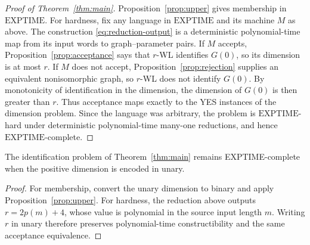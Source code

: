 \begin{proof}[Proof of Theorem~\ref{thm:main}]
Proposition~\ref{prop:upper} gives membership in \(\mathrm{EXPTIME}\).
For hardness, fix any language in \(\mathrm{EXPTIME}\) and its machine
\(M\) as above.  The construction \eqref{eq:reduction-output} is a
deterministic polynomial-time map from its input words to graph--parameter
pairs.  If \(M\) accepts, Proposition~\ref{prop:acceptance} says that
\(r\)-WL identifies \(G(0)\), so its dimension is at most \(r\).
If \(M\) does not accept, Proposition~\ref{prop:rejection} supplies an
equivalent nonisomorphic graph, so \(r\)-WL does not identify \(G(0)\).
By monotonicity of identification in the dimension, the dimension of
\(G(0)\) is then greater than \(r\).  Thus acceptance maps exactly to the
YES instances of the dimension problem.  Since the language was arbitrary,
the problem is \(\mathrm{EXPTIME}\)-hard under deterministic polynomial-time
many-one reductions, and hence \(\mathrm{EXPTIME}\)-complete.
\end{proof}

\begin{corollary}\label{cor:unary}
The identification problem of Theorem~\ref{thm:main} remains
EXPTIME-complete when the positive dimension is encoded in unary.
\end{corollary}
\begin{proof}
For membership, convert the unary dimension to binary and apply
Proposition~\ref{prop:upper}. For hardness, the reduction above outputs
\(r=2p(m)+4\), whose value is polynomial in the source input length
\(m\). Writing \(r\) in unary therefore preserves polynomial-time
constructibility and the same acceptance equivalence.
\end{proof}
